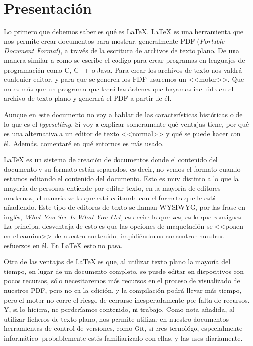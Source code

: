 \documentclass[a4paper]{article}
\begin{document}
\section{Presentación}\label{sec:presentacion}
Lo primero que debemos saber es qué es \LaTeX{}. \LaTeX{} es una herramienta
que nos permite crear documentos para mostrar, generalmente PDF
(\textit{Portable Document Format}), a través de la escritura de archivos de
texto plano. De una manera similar a como se escribe el código para crear
programas en lenguajes de programación como C, C++ o Java. Para crear los
archivos de texto nos valdrá cualquier editor, y para que se generen los PDF
usaremos un <<motor>>. Que no es más que un programa que leerá las órdenes
que hayamos incluido en el archivo de texto plano y generará el PDF a partir de
él.

Aunque en este documento no voy a hablar de las características históricas o de
lo que es el \textit{typesetting}. Sí voy a explicar someramente qué ventajas
tiene, por qué es una alternativa a un editor de texto <<normal>> y qué se puede
hacer con él. Además, comentaré en qué entornos es más usado.

\LaTeX{} es un sistema de creación de documentos donde el contenido del
documento y su formato están separados, es decir, no vemos el formato cuando
estamos editando el contenido del documento. Esto es muy distinto a lo que la 
mayoría de personas entiende por editar texto, en la mayoría de editores
modernos, el usuario ve lo que está editando con el formato que le está
añadiendo. Este tipo de editores de texto se llaman WYSIWYG, por las frase en
inglés, \textit{What You See Is What You Get}, es decir: lo que ves, es lo que
consigues. La principal desventaja de esto es que las opciones de maquetación
se <<ponen en el camino>> de nuestro contenido, impidiéndonos concentrar
nuestros esfuerzos en él. En \LaTeX{} esto no pasa.

Otra de las ventajas de \LaTeX{} es que, al utilizar texto plano la mayoría del
tiempo, en lugar de un documento completo, se puede editar en dispositivos con
pocos recursos, sólo necesitaremos más recursos en el proceso de visualizado de
nuestros PDF, pero no en la edición, y la compilación podrá llevar más tiempo,
pero el motor no corre el riesgo de cerrarse inesperadamente por falta de
recursos. Y, si lo hiciera, no perderíamos contenido, ni trabajo. Como nota
añadida, al utilizar ficheros de texto plano, nos permite utilizar en nuestro
documentos herramientas de control de versiones, como Git, si eres tecnológo,
especialmente informático, probablemente estés familiarizado con ellas, y las
uses diariamente.
\end{document}
